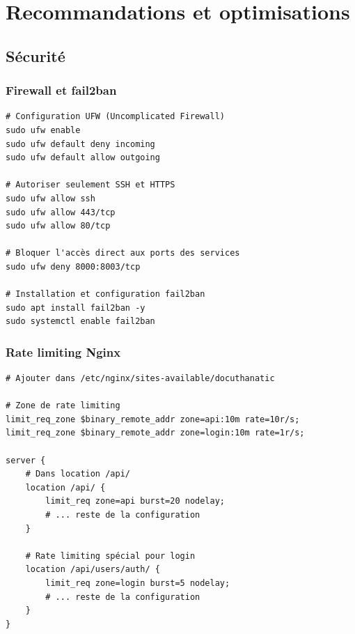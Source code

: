 \documentclass[12pt,a4paper]{article}
\begin{document}

\section{Recommandations et optimisations}

\subsection{Sécurité}

\subsubsection{Firewall et fail2ban}
\begin{lstlisting}[style=bash, caption={Configuration recommandée du firewall}]
# Configuration UFW (Uncomplicated Firewall)
sudo ufw enable
sudo ufw default deny incoming
sudo ufw default allow outgoing

# Autoriser seulement SSH et HTTPS
sudo ufw allow ssh
sudo ufw allow 443/tcp
sudo ufw allow 80/tcp

# Bloquer l'accès direct aux ports des services
sudo ufw deny 8000:8003/tcp

# Installation et configuration fail2ban
sudo apt install fail2ban -y
sudo systemctl enable fail2ban
\end{lstlisting}

\subsubsection{Rate limiting Nginx}
\begin{lstlisting}[style=bash, caption={Configuration rate limiting}]
# Ajouter dans /etc/nginx/sites-available/docuthanatic

# Zone de rate limiting
limit_req_zone $binary_remote_addr zone=api:10m rate=10r/s;
limit_req_zone $binary_remote_addr zone=login:10m rate=1r/s;

server {
    # Dans location /api/
    location /api/ {
        limit_req zone=api burst=20 nodelay;
        # ... reste de la configuration
    }
    
    # Rate limiting spécial pour login
    location /api/users/auth/ {
        limit_req zone=login burst=5 nodelay;
        # ... reste de la configuration
    }
}
\end{lstlisting}
\end{document}

